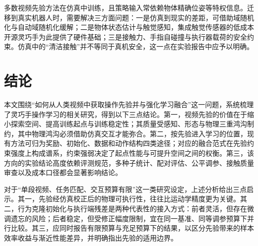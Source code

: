 \documentclass[UTF8,a4paper,zihao=-4]{ctexart}
\begin{document}
多数视频先验方法在仿真中训练，且策略输入常依赖物体精确位姿等特权信息。迁移到真实机器人时，需要解决三方面问题：一是仿真到现实的差距，可借助域随机化\cite{tobin2017}与自动域随机化\cite{rubik2019}缓解；二是物体状态估计与触觉感知，集成触觉传感器的低成本开源灵巧手\cite{orca}为此提供了硬件基础；三是接触力、手指自碰撞与执行器载荷的安全约束。仿真中的“清洁接触”并不等同于真机安全，这一点在实验报告中应予以明确。

\section{结论}\label{sec:conclusion}

本文围绕“如何从人类视频中获取操作先验并与强化学习融合”这一问题，系统梳理了灵巧手操作学习的相关研究，得到以下三点结论。第一，视频先验的价值在于缩小探索空间、提高训练起点与训练稳定性；其质量受感知、形态与物理三重鸿沟制约，其中物理鸿沟必须借助仿真交互才能弥合。第二，按先验进入学习的位置，现有方法可归为奖励、初始化、数据和动作结构四类途径；对应的融合范式在先验约束强度上构成谱系，约束强弱决定了起点性能与可提升空间之间的权衡。第三，该方向的实验结论高度依赖评测规范，多种子统计、配对评估、公平调参、接触质量审查以及成本口径都会显著影响结论。

对于“单段视频、任务匹配、交互预算有限”这一类研究设定，上述分析给出三点启示。其一，先验经仿真校正后的物理可执行性，往往比运动学精度更为关键。其二，行为克隆初始化与执行端残差是两种代表性的接入方式：前者灵活，但存在微调遗忘的风险；后者稳定，但受修正幅度限制，宜在同一基准、同等调参预算下并行比较。其三，应同时报告有限预算与充足预算下的结果，以区分先验带来的样本效率收益与渐近性能差异，并明确指出先验的适用边界。


\end{document}
